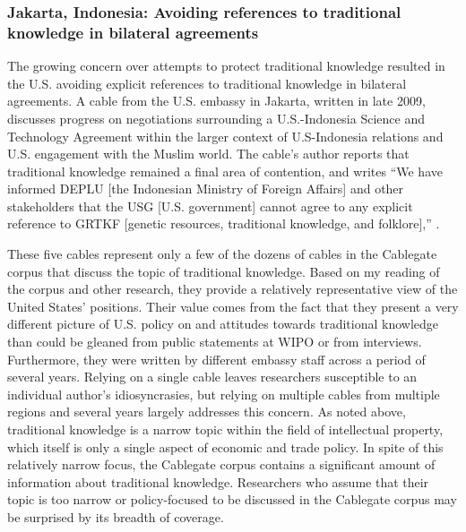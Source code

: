 \documentclass[12pt]{article}
\begin{document}
\subsubsection{Jakarta, Indonesia: Avoiding references to traditional knowledge in bilateral agreements}
The growing concern over attempts to protect traditional knowledge resulted 
in the U.S. avoiding explicit references to traditional 
knowledge in 
bilateral agreements.
A cable from the U.S. embassy in Jakarta, written in 
late 2009, discusses progress on negotiations surrounding a U.S.-Indonesia Science and Technology 
Agreement within the larger context of U.S-Indonesia relations and U.S. engagement with the Muslim 
world. The cable's author reports that traditional knowledge remained a final area of contention, and 
writes ``We have informed DEPLU [the Indonesian Ministry of Foreign Affairs] and other
stakeholders that the USG [U.S. government] cannot agree to any explicit reference to
GRTKF [genetic resources, traditional knowledge, and 
folklore],'' \citep{u.s._department_of_state2009indonesia}.


These five cables represent only a few of the dozens of cables in the Cablegate corpus that discuss 
the topic of 
traditional knowledge. Based on my reading of the corpus and other research, they 
provide a relatively representative 
view of the United States' positions. Their value comes from the fact that they present a very different 
picture of U.S. policy 
on and attitudes towards traditional knowledge than could be gleaned from public statements at WIPO or 
from interviews. Furthermore, they were written by different embassy staff 
across a period of 
several years. Relying on a single cable leaves researchers susceptible to an 
individual author's idiosyncrasies, but relying on multiple cables from multiple regions and 
several years largely addresses this concern. As noted above, traditional knowledge is a narrow topic 
within the field of intellectual property, which itself is only a single aspect of economic and 
trade policy. In spite of this relatively narrow focus, the Cablegate corpus contains a significant 
amount of information about traditional knowledge. Researchers who assume that their topic is too 
narrow or policy-focused to be discussed in the Cablegate corpus may be surprised by its breadth of coverage.
\end{document}
